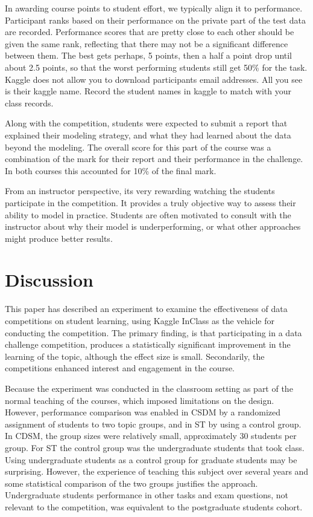 \documentclass[12pt]{article}
\begin{document}
In awarding course points to student effort, we typically align it to
performance. Participant ranks based on their performance on the private
part of the test data are recorded. Performance scores that are pretty
close to each other should be given the same rank, reflecting that there
may not be a significant difference between them. The best gets perhaps,
5 points, then a half a point drop until about 2.5 points, so that the
worst performing students still get 50\% for the task. Kaggle does not
allow you to download participants email addresses. All you see is their
kaggle name. Record the student names in kaggle to match with your class
records.

Along with the competition, students were expected to submit a report
that explained their modeling strategy, and what they had learned about
the data beyond the modeling. The overall score for this part of the
course was a combination of the mark for their report and their
performance in the challenge. In both courses this accounted for 10\% of
the final mark.

From an instructor perspective, its very rewarding watching the students
participate in the competition. It provides a truly objective way to
assess their ability to model in practice. Students are often motivated
to consult with the instructor about why their model is underperforming,
or what other approaches might produce better results.

\section{Discussion}\label{discussion}

This paper has described an experiment to examine the effectiveness of
data competitions on student learning, using Kaggle InClass as the
vehicle for conducting the competition. The primary finding, is that
participating in a data challenge competition, produces a statistically
significant improvement in the learning of the topic, although the
effect size is small. Secondarily, the competitions enhanced interest
and engagement in the course.

Because the experiment was conducted in the classroom setting as part of
the normal teaching of the courses, which imposed limitations on the
design. However, performance comparison was enabled in CSDM by a
randomized assignment of students to two topic groups, and in ST by
using a control group. In CDSM, the group sizes were relatively small,
approximately 30 students per group. For ST the control group was the
undergraduate students that took class. Using undergraduate students as
a control group for graduate students may be surprising. However, the
experience of teaching this subject over several years and some
statistical comparison of the two groups justifies the approach.
Undergraduate students performance in other tasks and exam questions,
not relevant to the competition, was equivalent to the postgraduate
students cohort.
\end{document}
